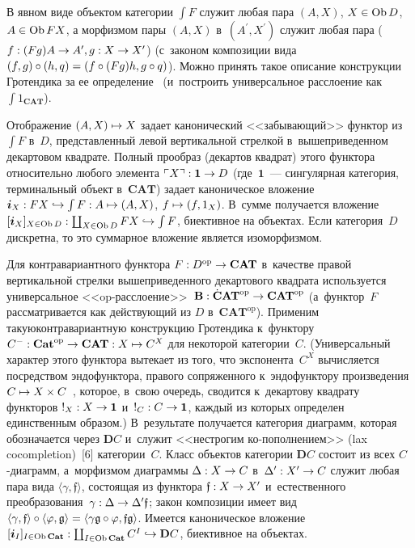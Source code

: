 \begin{multicols}{2}
     В явном виде объектом категории $\int F$ служит любая пара $(A, X)$, $X 
\hm\in \mathrm{Ob} \,D$, $A \hm\in \mathrm{Ob}\, FX$, а морфизмом пары $(A, X)$ 
в~$(A^\prime, X^\prime)$ служит любая пара ($f : (Fg)A \hm\to  A^\prime, g : X 
\hm\to  X^\prime$) (с~законом композиции вида $(f, g) \circ (h, q) \hm= (f \circ 
(Fg)h, g \circ q)$). Можно принять такое описание конструкции Гротендика за 
ее определение~\cite[п.~12.2.10]{10-kov} (и~построить универсальное 
расслоение как $\int 1_{\mathbf{CAT}}$).
     
     Отображение $(A, X) \hm\mapsto X$ задает канонический 
<<забывающий>> функтор из $\int F$ в~$D$, представленный левой 
вертикальной стрелкой в~вышеприведенном декартовом квадрате. Полный 
прообраз (декартов квадрат) этого функтора относительно любого элемента 
$\ulcorner X\urcorner: \bm{1}\hm\to D$ (где~$\bm{1}$~--- сингулярная 
категория, терминальный объект в~$\mathbf{CAT}$) задает каноническое 
вложение $\bm{i}_X : FX \hm\hookrightarrow \int F : A \hm\mapsto (A, X)$, $f 
\hm\mapsto  (f, 1_X)$. В~сумме получается вложение $[\bm{i}_X]_{X \in \mathrm{Ob}\,D} : 
\coprod_{X \in \mathrm{Ob}\,D} FX \hm\hookrightarrow \int F$, биективное на объектах. 
Если категория~$D$ дискретна, то это суммарное вложение является 
изоморфизмом.
     
     Для контравариантного функтора $F : D^{\mathrm{op}}\hm\to \mathbf{CAT}$ 
в~качестве правой вертикальной стрелки вышеприведенного декартового 
квадрата используется универсальное <<op-рас\-сло\-ение>>~$\mathbf{B} : 
\dot{\mathbf{C}}\mathbf{AT}^{\mathrm{op}} \hm\to 
\mathbf{CAT}^{\mathrm{op}}$ (а~функтор~$F$ рассматривается как 
действующий из $D$ в~$\mathbf{CAT}^{\mathrm{op}}$). Применим такую\linebreak \mbox{контравариантную} конструкцию 
Гротендика к~функтору $C^-: \mathbf{Cat}^{\mathrm{op}} \hm\to 
\mathbf{CAT} : X \hm\mapsto C^X$ для некоторой категории~$C$. 
(Универсальный характер этого функтора вытекает из того, что 
экспонента~$C^X$ вычисляется посредством эндофунктора, правого 
сопряженного к~эндофунктору произведения $C\hm \mapsto X \times 
C$~\cite[\S\,IV.6]{8-kov}, которое, в~свою очередь, сводится к~декартову 
квадрату функторов $!_X : X \hm\to \bm{1}$ и~$!_C : C\hm\to \bm{1}$, каждый из 
которых определен единственным образом.) В~результате получается 
категория диаграмм, которая обозначается через $\mathbf{D}C$ и~служит 
<<нестрогим ко-пополнением>> (lax cocompletion)~[6] категории~$C$. Класс 
объектов категории $\mathbf{D}C$ состоит из всех $C$-диа\-грамм, 
а~морфизмом диаграммы $\Delta  : X \hm\to  C$ в~$\Delta^\prime : X^\prime\hm\to  
C$ служит любая пара вида $\langle \gamma, \mathfrak{f}\rangle$, состоящая из 
функтора $\mathfrak{f} : X \hm\to  X^\prime$ и~естественного 
преобразования~$\gamma : \Delta \hm\to \Delta^\prime \mathfrak{f}$; закон 
композиции имеет вид $\langle \gamma, \mathfrak{f}\rangle  \circ \langle \varphi, 
\mathfrak{g}\rangle \hm= \langle \gamma\mathfrak{g}\circ \varphi, 
\mathfrak{fg}\rangle$. Имеется каноническое вложение $[\bm{i}_I]_{I \in \mathrm{Ob}\, 
\mathbf{Cat}} : \coprod_{I \in \mathrm{Ob}\,\mathbf{Cat}} C^I \hm\hookrightarrow \mathbf{D}C$, 
биективное на объектах.
     

\end{multicols}
